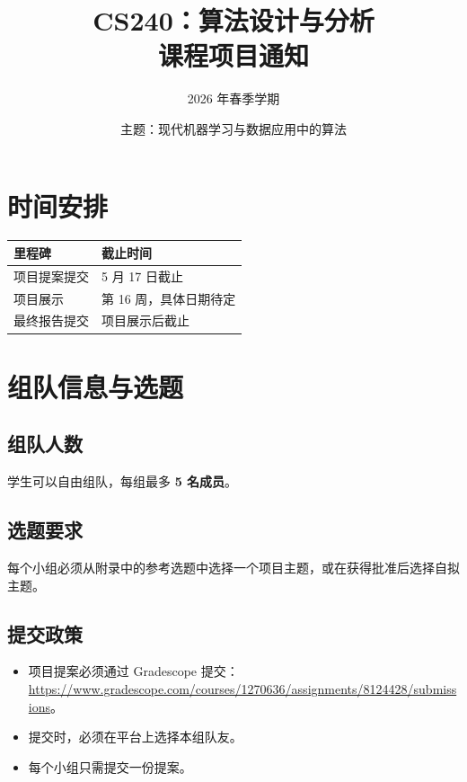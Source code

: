 \documentclass[UTF8, 10pt]{ctexart}
\title{\textbf{CS240：算法设计与分析}\\
课程项目通知}
\author{2026 年春季学期}
\date{主题：现代机器学习与数据应用中的算法}
\begin{document}
\maketitle

\vspace{-1.4em}

\section{时间安排}

\begin{center}
\begin{tabular}{ll}
\toprule
里程碑 & 截止时间 \\
\midrule
项目提案提交 & 5 月 17 日截止 \\
项目展示 & 第 16 周，具体日期待定 \\
最终报告提交 & 项目展示后截止 \\
\bottomrule
\end{tabular}
\end{center}

\section{组队信息与选题}

\subsection{组队人数}

学生可以自由组队，每组最多 \textbf{5 名成员}。

\subsection{选题要求}

每个小组必须从附录中的参考选题中选择一个项目主题，或在获得批准后选择自拟
主题。

\subsection{提交政策}

\begin{itemize}
    \item 项目提案必须通过 Gradescope 提交：
    {\footnotesize\url{https://www.gradescope.com/courses/1270636/assignments/8124428/submissions}}。
    \item 提交时，必须在平台上选择本组队友。
    \item 每个小组只需提交一份提案。
\end{itemize}
\end{document}
